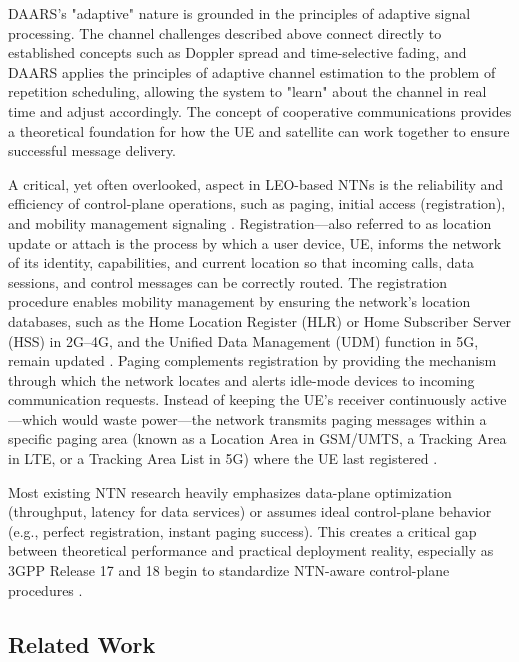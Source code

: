 \documentclass[conference]{IEEEtran}
\begin{document}
DAARS's "adaptive" nature is grounded in the principles of adaptive signal processing. The channel challenges described above connect directly to established concepts such as Doppler spread and time-selective fading, and DAARS applies the principles of adaptive channel estimation to the problem of repetition scheduling, allowing the system to "learn" about the channel in real time and adjust accordingly. The concept of cooperative communications provides a theoretical foundation for how the UE and satellite can work together to ensure successful message delivery.

A critical, yet often overlooked, aspect in LEO-based NTNs is the reliability and efficiency of control-plane operations, such as paging, initial access (registration), and mobility management signaling \cite{Ref5}. Registration—also referred to as location update or attach is the process by which a user device, UE, informs the network of its identity, capabilities, and current location so that incoming calls, data sessions, and control messages can be correctly routed. The registration procedure enables mobility management by ensuring the network's location databases, such as the Home Location Register (HLR) or Home Subscriber Server (HSS) in 2G–4G, and the Unified Data Management (UDM) function in 5G, remain updated \cite{Ref6,Ref7,Ref8}. Paging complements registration by providing the mechanism through which the network locates and alerts idle-mode devices to incoming communication requests. Instead of keeping the UE's receiver continuously active—which would waste power—the network transmits paging messages within a specific paging area (known as a Location Area in GSM/UMTS, a Tracking Area in LTE, or a Tracking Area List in 5G) where the UE last registered \cite{Ref9}.

Most existing NTN research heavily emphasizes data-plane optimization (throughput, latency for data services) or assumes ideal control-plane behavior (e.g., perfect registration, instant paging success). This creates a critical gap between theoretical performance and practical deployment reality, especially as 3GPP Release 17 and 18 begin to standardize NTN-aware control-plane procedures \cite{Ref14}.


\subsection{Related Work}
\label{sec:literature_difference}
\end{document}
